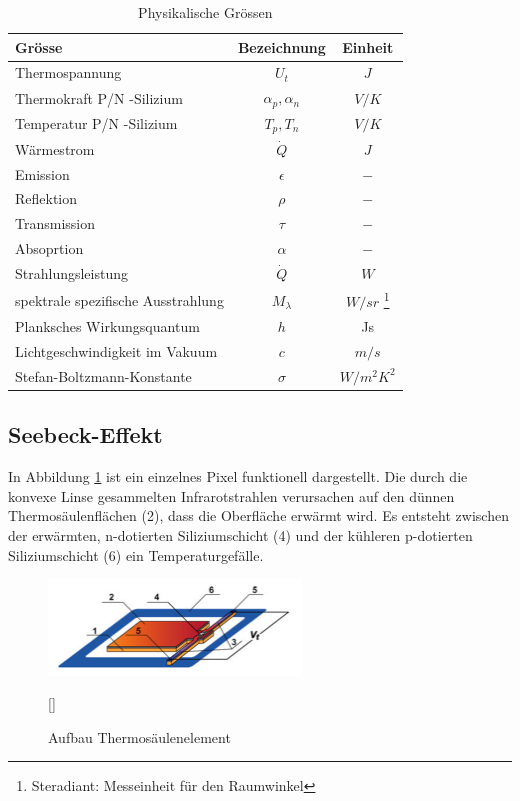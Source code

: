 \begin{table}[H]
	\centering
	\begin{tabular}{l|c|c}
		\rowcolor{gray} Grösse &  Bezeichnung  & Einheit \\
		\hline 
		Thermospannung &  $ U_{t}$ & $J$  \\ 
		\rowcolor{gray} Thermokraft P/N -Silizium  & $\alpha_{p},\alpha_{n}$ & $V/K$\\	
		Temperatur P/N -Silizium &  $T_{p},T_{n}$ & $V/K$ \\
		\rowcolor{gray}Wärmestrom &  $\dot{Q}$ & $J$  \\ 
		Emission & $\epsilon$ & $-$\\	
		\rowcolor{gray}Reflektion &  $\rho $ & $-$ \\
		Transmission & $\tau$ & $-$\\
		\rowcolor{gray}Absoprtion &  $\alpha$ & $-$  \\ 
		Strahlungsleistung & $\dot{Q}$ & $W$\\
		\rowcolor{gray}spektrale spezifische Ausstrahlung &  $M_{\lambda }$ & $W/sr$ \footnote[2]{Steradiant: Messeinheit für den Raumwinkel} \\
		Planksches Wirkungsquantum &  $ h$ & Js \\ 
		\rowcolor{gray} Lichtgeschwindigkeit im Vakuum & $c $ & $ m/s$ \\ 
 		Stefan-Boltzmann-Konstante & $\sigma$ & $ W/m^2K^2 $ \\ 
	\end{tabular}
	\caption{Physikalische Grössen}
	\label{tab:Legende Physikalische Grössen} 
\end{table} 


\subsection{Seebeck-Effekt}
\label{subsec:seebeck}
In Abbildung \ref{fig:AufbauThermo} ist ein einzelnes Pixel funktionell dargestellt. Die durch die konvexe Linse gesammelten Infrarotstrahlen verursachen auf den dünnen Thermosäulenflächen (2), dass die Oberfläche erwärmt wird. Es entsteht zwischen der erwärmten, n-dotierten Siliziumschicht (4) und der kühleren p-dotierten Siliziumschicht (6) ein Temperaturgefälle.   

\begin{figure}[H]
	\centering
	\includegraphics[width=0.6\textwidth]
	{fig/Mems_Thermopile.PNG}
	\caption[Aufbau Thermosäulenelement]{Aufbau Thermosäulenelement} []\protect\cite{AMG8834]}
	\label{fig:AufbauThermo}
\end{figure}

